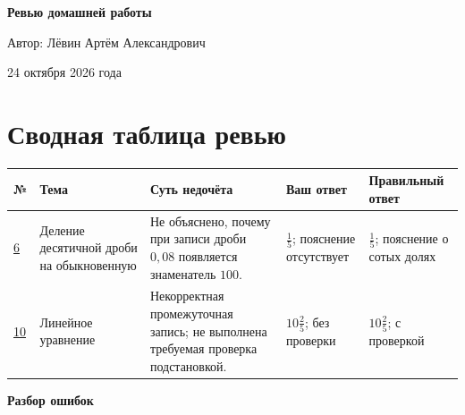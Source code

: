 \documentclass[11pt,a4paper]{article}
\begin{document}
\begin{titlepage}
  \thispagestyle{empty}
  \begin{center}
    \vspace*{0.28\textheight}
    {\LARGE\bfseries Ревью домашней работы\par}
    \vspace{15mm}
    {\large Автор: Лёвин Артём Александрович\par}
    \vspace{8mm}
    {\large 24 октября 2026 года\par}
  \end{center}
  \vfill
  \begin{center}
  \end{center}
\end{titlepage}

\clearpage
\section*{Сводная таблица ревью}
\small
\setlength{\tabcolsep}{3pt}
\begin{longtable}{@{}>{\raggedright\arraybackslash}p{0.9cm}>{\raggedright\arraybackslash}p{3.2cm}>{\raggedright\arraybackslash}p{5.0cm}>{\raggedright\arraybackslash}p{2.7cm}>{\raggedright\arraybackslash}p{2.9cm}@{}}
\toprule
\textbf{№} & \textbf{Тема} & \textbf{Суть недочёта} & \textbf{Ваш ответ} & \textbf{Правильный ответ}\\
\midrule
\endhead
\hyperref[task:6]{6} & Деление десятичной дроби на обыкновенную & Не объяснено, почему при записи дроби $0{,}08$ появляется знаменатель $100$. & $\frac15$; пояснение отсутствует & $\frac15$; пояснение о сотых долях\\
\addlinespace[4pt]
\hyperref[task:10]{10} & Линейное уравнение & Некорректная промежуточная запись; не выполнена требуемая проверка подстановкой. & $10\frac25$; без проверки & $10\frac25$; с проверкой\\
\bottomrule
\end{longtable}
\normalsize

\clearpage
\thispagestyle{plain}
\vspace*{\fill}
\begin{center}
  {\LARGE\bfseries Разбор ошибок}
\end{center}
\vspace*{\fill}
\clearpage
\end{document}
